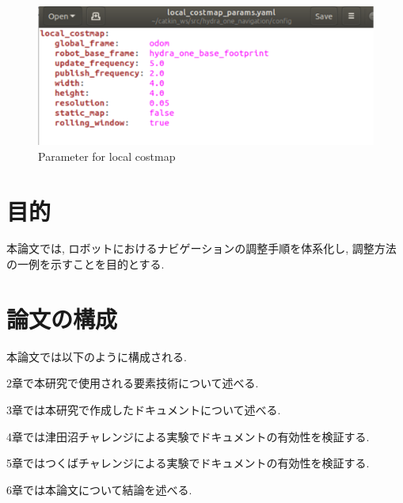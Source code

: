 \begin{figure}[hbtp]
  \centering
 \includegraphics[keepaspectratio, scale=0.17]
      {images/param_example_3.png}
 \caption{Parameter for local costmap}
 \label{Fig:param_example_3}
\end{figure}

\newpage
\section{目的}
本論文では, ロボットにおけるナビゲーションの調整手順を体系化し, 調整方法の一例を示すことを目的とする. 

\section{論文の構成}
本論文では以下のように構成される. 

2章で本研究で使用される要素技術について述べる. 

3章では本研究で作成したドキュメントについて述べる. 

4章では津田沼チャレンジによる実験でドキュメントの有効性を検証する. 

5章ではつくばチャレンジによる実験でドキュメントの有効性を検証する. 

6章では本論文について結論を述べる. 

\newpage
